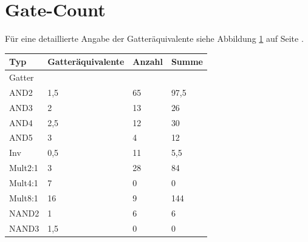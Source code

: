 \documentclass[11pt]{report}
\begin{document}
	\section{Gate-Count}
	Für eine detaillierte Angabe der Gatteräquivalente siehe Abbildung \ref{gatecount} auf Seite \pageref{gatecount}.
	\begin{table}[h]
		\small
		\centering
		\label{gatecount}
		\begin{tabular}{llll}
			\hline
			Typ                                          & Gatteräquivalente          & Anzahl                  & Summe                      \\ \hline\hline
			\multicolumn{1}{|l}{Gatter}                  &                            &                         & \multicolumn{1}{l|}{}      \\ \hline
			\multicolumn{1}{|l|}{AND2}                   & \multicolumn{1}{l|}{1,5}   & \multicolumn{1}{l|}{65} & \multicolumn{1}{l|}{97,5}  \\ \hline
			\multicolumn{1}{|l|}{AND3}                   & \multicolumn{1}{l|}{2}     & \multicolumn{1}{l|}{13} & \multicolumn{1}{l|}{26}    \\ \hline
			\multicolumn{1}{|l|}{AND4}                   & \multicolumn{1}{l|}{2,5}   & \multicolumn{1}{l|}{12} & \multicolumn{1}{l|}{30}    \\ \hline
			\multicolumn{1}{|l|}{AND5}                   & \multicolumn{1}{l|}{3}     & \multicolumn{1}{l|}{4}  & \multicolumn{1}{l|}{12}    \\ \hline
			\multicolumn{1}{|l|}{Inv}                    & \multicolumn{1}{l|}{0,5}   & \multicolumn{1}{l|}{11} & \multicolumn{1}{l|}{5,5}   \\ \hline
			\multicolumn{1}{|l|}{Mult2:1}                & \multicolumn{1}{l|}{3}     & \multicolumn{1}{l|}{28} & \multicolumn{1}{l|}{84}    \\ \hline
			\multicolumn{1}{|l|}{Mult4:1}                & \multicolumn{1}{l|}{7}     & \multicolumn{1}{l|}{0}  & \multicolumn{1}{l|}{0}     \\ \hline
			\multicolumn{1}{|l|}{Mult8:1}                & \multicolumn{1}{l|}{16}    & \multicolumn{1}{l|}{9}  & \multicolumn{1}{l|}{144}   \\ \hline
			\multicolumn{1}{|l|}{NAND2}                  & \multicolumn{1}{l|}{1}     & \multicolumn{1}{l|}{6}  & \multicolumn{1}{l|}{6}     \\ \hline
			\multicolumn{1}{|l|}{NAND3}                  & \multicolumn{1}{l|}{1,5}   & \multicolumn{1}{l|}{0}  & \multicolumn{1}{l|}{0}     \\ \hline

\end{tabular}
\end{table}
\end{document}
